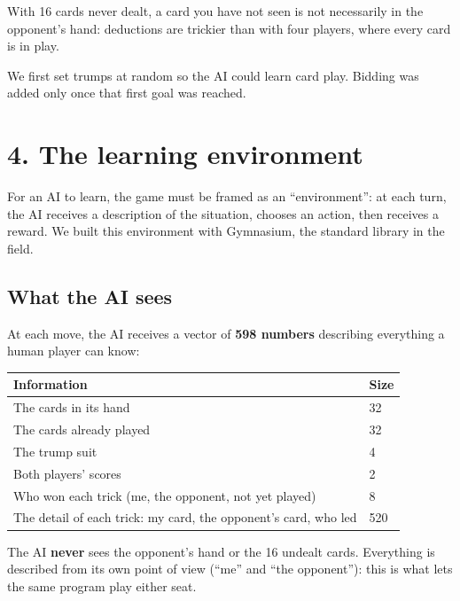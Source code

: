 With 16 cards never dealt, a card you have not seen is not necessarily in the opponent's hand: deductions are trickier than with four players, where every card is in play.

We first set trumps at random so the AI could learn card play. Bidding was added only once that first goal was reached.

\section*{4. The learning environment}

For an AI to learn, the game must be framed as an ``environment'': at each turn, the AI receives a description of the situation, chooses an action, then receives a reward. We built this environment with Gymnasium, the standard library in the field.

\subsection*{What the AI sees}

At each move, the AI receives a vector of \textbf{598 numbers} describing everything a human player can know:

\begin{table}[htbp]\centering\small\begin{tabularx}{\linewidth}{Xl}\toprule

Information & Size \\\midrule

The cards in its hand & 32 \\

The cards already played & 32 \\

The trump suit & 4 \\

Both players' scores & 2 \\

Who won each trick (me, the opponent, not yet played) & 8 \\

The detail of each trick: my card, the opponent's card, who led & 520 \\

\bottomrule\end{tabularx}\end{table}

The AI \textbf{never} sees the opponent's hand or the 16 undealt cards. Everything is described from its own point of view (``me'' and ``the opponent''): this is what lets the same program play either seat.

